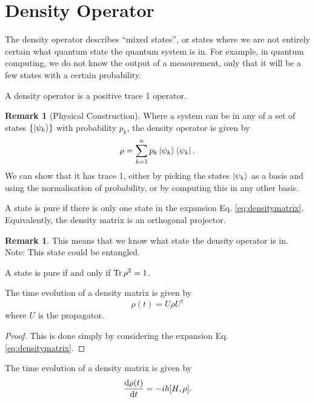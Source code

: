 \documentclass[twoside,symmetric, openany, 12pt]{./tuftebook}
\theoremstyle{definition}
\newtheorem{Remark}[Theorem]{Remark}
\theoremstyle{definition}
\theoremstyle{definition}
\begin{document}
\section{Density Operator}
The density operator describes ``mixed states'', or states where we are not entirely certain what quantum state the quantum system is in. For example, in quantum computing, we do not know the output of a measurement, only that it will be a few states with a certain probability.
\begin{Definition}
	A density operator is a positive trace 1 operator.
\end{Definition}
\begin{Remark}[Physical Construction]
	Where a system can be in any of a set of states $\{\ket{\psi_k}\}$ with probability $p_k$, the density operator is given by
	\begin{equation}\label{eq:densitymatrix}
		\rho = \sum_{k=1}^n p_k \ket{\psi_k}\bra{\psi_k}
	.\end{equation}
	We can show that it has trace 1, either by picking the states $\ket{\psi_k}$ as a basis and using the normalisation of probability, or by computing this in any other basis.
\end{Remark}
\begin{Definition}
	A state is pure if there is only one state in the expansion Eq. \eqref{eq:densitymatrix}. Equivalently, the density matrix is an orthogonal projector.
\end{Definition}
\begin{Remark}
	This means that we know what state the density operator is in. Note: This state could be entangled.
\end{Remark}
\begin{Corollary}
	A state is pure if and only if $\Tr \rho^2 = 1$.
\end{Corollary}
\begin{Theorem}
	The time evolution of a density matrix is given by
	\[
	\rho(t) = U\rho U^\dagger
\]
where $U$ is the propagator.
\end{Theorem}
\begin{proof}
	This is done simply by considering the expansion Eq. \eqref{eq:densitymatrix}.
\end{proof}
\begin{Theorem}
	The time evolution of a density matrix is given by
	\[
		\dv{\rho(t)}{t} = -i\hbar [H, \rho]
	.\] 
\end{Theorem}
\end{document}
